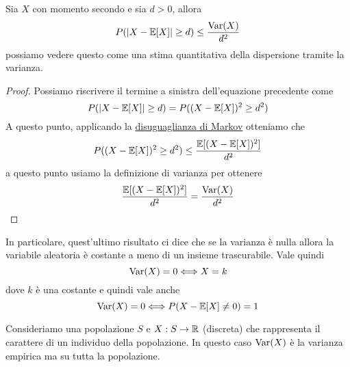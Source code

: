 \begin{proposition}
	Sia $X$ con momento secondo e sia $d > 0$, allora
	\[ P(|X - \mathbb{E}[X]| \geq d) \leq \frac{\operatorname{Var}(X)}{d^2} \]
	possiamo vedere questo come una stima quantitativa della dispersione tramite la varianza.
	\begin{proof}
		Possiamo riscrivere il termine a sinistra dell'equazione precedente come
		\[ P(|X - \mathbb{E}[X]| \geq d) = P((X - \mathbb{E}[X])^2 \geq d^2) \]
		A questo punto, applicando la \hyperref[prop: markov]{disuguaglianza di Markov} otteniamo
		che
		\[ P((X - \mathbb{E}[X])^2 \geq d^2) \leq \frac{\mathbb{E}[(X - \mathbb{E}[X])^2]}{d^2} \]
		a questo punto usiamo la definizione di varianza per ottenere
		\[ \frac{\mathbb{E}[(X - \mathbb{E}[X])^2]}{d^2} = \frac{\operatorname{Var}(X)}{d^2} \]
	\end{proof}
\end{proposition}

In particolare, quest'ultimo risultato ci dice che se la varianza è nulla allora la variabile
aleatoria è costante a meno di un insieme trascurabile. Vale quindi
\[ \operatorname{Var}(X) = 0 \Longleftrightarrow X = k \]
dove $k$ è una costante e quindi vale anche
\[ \operatorname{Var}(X) = 0 \Longleftrightarrow P(X - \mathbb{E}[X] \neq 0) = 1 \]

\begin{example}
	Consideriamo una popolazione $S$ e $X : S \to \mathbb{R}$ (discreta) che rappresenta il carattere di un
	individuo della popolazione. In questo caso $\operatorname{Var}(X)$ è la varianza empirica ma su tutta la
	popolazione.
\end{example}
